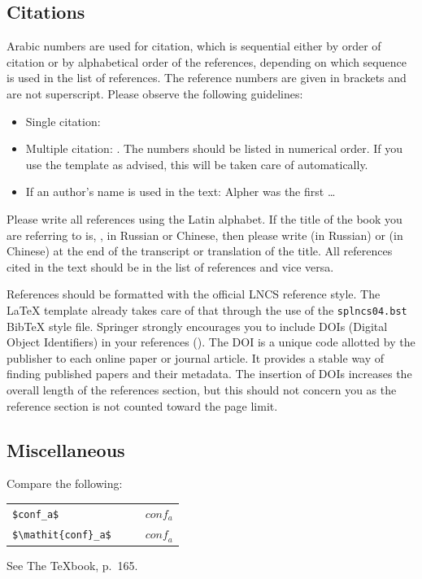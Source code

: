 \documentclass[runningheads]{llncs}
\begin{document}
\subsection{Citations}
Arabic numbers are used for citation, which is sequential either by order of citation or by alphabetical order of the references, depending on which sequence is used in the list of references. 
The reference numbers are given in brackets and are not superscript.
Please observe the following guidelines:
\begin{itemize}
\item Single citation: \cite{Anonymous24}
\item Multiple citation: \cite{Alpher02,Alpher03,Alpher05,Anonymous24b,Anonymous24}. 
  The numbers should be listed in numerical order.
  If you use the template as advised, this will be taken care of automatically.
\item If an author's name is used in the text: Alpher \cite{Alpher02} was the first \ldots
\end{itemize}
Please write all references using the Latin alphabet. If the title of the book you are referring to is, \eg, in Russian or Chinese, then please write (in Russian) or (in Chinese) at the end of the transcript or translation of the title.
All references cited in the text should be in the list of references and vice versa.

References should be formatted with the official LNCS reference style.
The \LaTeX{} template already takes care of that through the use of the \texttt{splncs04.bst} Bib\TeX{} style file.
Springer strongly encourages you to include DOIs (Digital Object Identifiers) in your references (\cf \cite{ECCV2022}). 
The DOI is a unique code allotted by the publisher to each online paper or journal article. 
It provides a stable way of finding published papers and their metadata. 
The insertion of DOIs increases the overall length of the references section, but this should not concern you as the reference section is not counted toward the page limit.


\subsection{Miscellaneous}
Compare the following:
\begin{center}
  \begin{tabular}{ll}
    \verb'$conf_a$'          & $\qquad conf_a$ \\
    \verb'$\mathit{conf}_a$' & $\qquad \mathit{conf}_a$
  \end{tabular}
\end{center}
See The \TeX book, p.\ 165.
\end{document}
